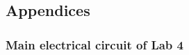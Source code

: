 \documentclass{article}
\begin{document}
\newpage				%
\begin{appendices}
\part*{Appendices}
\vspace{-1cm}
\renewcommand{\contentsname}{}
\localtableofcontents*


    \begin{landscape}
    \section{\label{app:main-circuit}Main electrical circuit of Lab 4}
    \begin{figure}[h!]
	
	\end{figure}
	\end{landscape}

\end{appendices}
\end{document}
